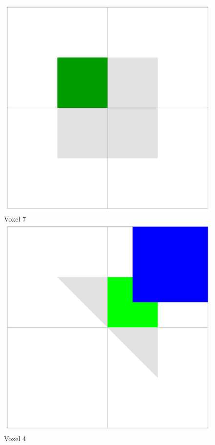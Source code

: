 \begin{figure}[!htb]
  \includegraphics[width=\linewidth]{drawings/cubes_07.pdf}
  Voxel 7
\endminipage
{}%
  \includegraphics[width=\linewidth]{drawings/cubes_04.pdf}
  Voxel 4
  

\end{figure}
